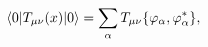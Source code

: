 \begin{equation}
\langle 0|T_{\mu \nu }(x)|0\rangle =\sum_{\alpha }T_{\mu \nu }\{\varphi {%
_{\alpha },\varphi _{\alpha }^{\ast }\}},  \label{emtvev1}
\end{equation}

